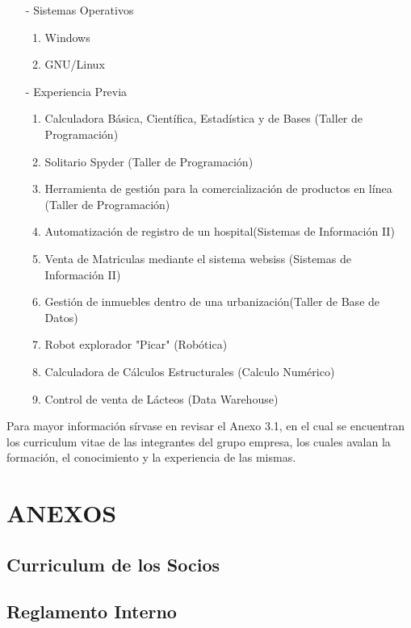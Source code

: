 \documentclass[11pt,letterpaper]{report}
\begin{document}
\begin{itemize}
\item[-] Sistemas Operativos
\begin{enumerate}
\item Windows
\item GNU/Linux
\end{enumerate}

\item[-] Experiencia Previa
\begin{enumerate}
\item Calculadora Básica, Científica, Estadística y de Bases (Taller de Programación)
\item Solitario Spyder (Taller de Programación)
\item Herramienta de gestión para la comercialización de productos en línea (Taller de Programación)
\item Automatización de registro de un hospital(Sistemas de Información II)
\item Venta de Matriculas mediante el sistema websiss (Sistemas de Información II)
\item Gestión de inmuebles dentro de una urbanización(Taller de Base de Datos)
\item Robot explorador "Picar" (Robótica)
\item Calculadora de Cálculos Estructurales (Calculo Numérico)
\item Control de venta de Lácteos (Data Warehouse)
\end{enumerate}
\end{itemize}
Para mayor información sírvase en revisar el Anexo 3.1, en el cual se encuentran los curriculum vitae de las integrantes del grupo empresa, los cuales avalan la formación, el conocimiento y la experiencia de las mismas.
\chapter*{ ANEXOS }
\section{ Curriculum de los Socios }




\section{ Reglamento Interno }
\end{document}
